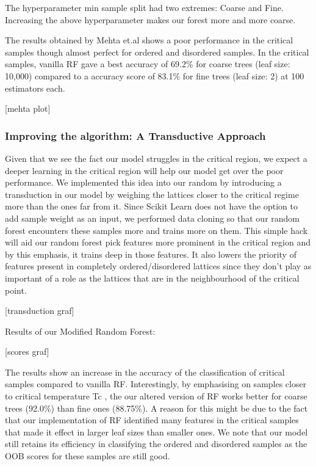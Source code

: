 The hyperparameter min sample split had two extremes: Coarse and Fine. Increasing the above hyperparameter makes our forest more and more coarse.

The results obtained by Mehta et.al\cite{mehta} shows a poor performance in the critical samples though almost perfect for ordered and disordered samples. In the critical samples, vanilla RF gave a best accuracy of 69.2\% for coarse trees (leaf size: 10,000) compared to a accuracy score of 83.1\% for fine trees (leaf size: 2) at 100 estimators each.

[mehta plot]

\subsubsection{Improving the algorithm: A Transductive Approach}
Given that we see the fact our model struggles in the critical region, we expect a deeper learning in the critical region will help our model get over the poor performance. We implemented this idea into our random by introducing a transduction in our model by weighing the lattices closer to the critical regime more than the ones far from it. Since Scikit Learn does not have the option to add sample weight as an input, we performed data cloning so that our random forest encounters these samples more and trains more on them. This simple hack will aid our random forest pick features more prominent in the critical region and by this emphasis, it trains deep in those features. It also lowers the priority of features present in completely ordered/disordered lattices since they don’t play as important of a role as the lattices that are in the neighbourhood of the critical point.

[transduction graf]

Results of our Modified Random Forest:

[scores graf]

The results show an increase in the accuracy of the classification of critical samples compared to vanilla RF. Interestingly, by emphasising on samples closer to critical temperature Tc , the our altered version of RF works better
for coarse trees (92.0\%) than fine ones (88.75\%). A reason for this might be due to the fact that our implementation of RF identified many features in the critical samples that made it effect in larger leaf sizes than smaller ones. We note that our model still retains its efficiency in classifying the ordered and disordered samples as the OOB scores for these samples are still good.
